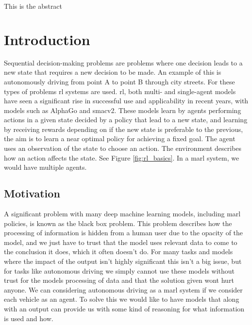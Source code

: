 \documentclass[UKenglish]{uiomasterthesis}
\begin{document}
\abstract
This is the abstract

\tableofcontents
\listoftables
\listoffigures
\chapter{Introduction}


Sequential decision-making problems are problems where one decision leads to a new state that requires a new decision to be made. An example of this is autonomously driving from point A to point B through city streets. For these types of problems \ac{rl} systems are used. \ac{rl}, both multi- and single-agent models have seen a significant rise in successful use and applicability in recent years, with models such as AlphaGo\cite{article} and smacv2\cite{ellis2023smacv2}. These models learn by agents performing actions in a given state decided by a policy that lead to a new state, and learning by receiving rewards depending on if the new state is preferable to the previous, the aim is to learn a near optimal policy for achieving a fixed goal\cite{Sutton1998}. The agent uses an observation of the state to choose an action. The environment describes how an action affects the state. See Figure \ref{fig:rl_basics}. In a \ac{marl} system, we would have multiple agents.

\section{Motivation}
\label{sec:motivation}
A significant problem with many deep machine learning models, including \ac{marl} policies, is known as the black box problem\cite{zednik2019solving}. This problem describes how the processing of information is hidden from a human user due to the opacity of the model, and we just have to trust that the model uses relevant data to come to the conclusion it does, which it often doesn't do. For many tasks and models where the impact of the output isn't highly significant this isn't a big issue, but for tasks like autonomous driving we simply cannot use these models without trust for the models processing of data and that the solution given wont hurt anyone. We can considering autonomous driving as a \ac{marl} system if we consider each vehicle as an agent. To solve this we would like to have models that along with an output can provide us with some kind of reasoning for what information is used and how.
\end{document}
